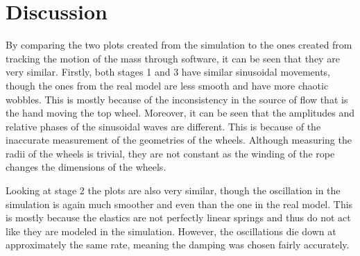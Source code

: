\documentclass[twoside,twocolumn]{article}
\begin{document}
\section{Discussion}

By comparing the two plots created from the simulation to the ones created from tracking the motion of the mass through software, it can be seen that they are very similar. Firstly, both stages 1 and 3 have similar sinusoidal movements, though the ones from the real model are less smooth and have more chaotic wobbles. This is mostly because of the inconsistency in the source of flow that is the hand moving the top wheel. Moreover, it can be seen that the amplitudes and relative phases of the sinusoidal waves are different. This is because of the inaccurate measurement of the geometries of the wheels. Although measuring the radii of the wheels is trivial, they are not constant as the winding of the rope changes the dimensions of the wheels.

Looking at stage 2 the plots are also very similar, though the oscillation in the simulation is again much smoother and even than the one in the real model. This is mostly because the elastics are not perfectly linear springs and thus do not act like they are modeled in the simulation. However, the oscillations die down at approximately the same rate, meaning the damping was chosen fairly accurately.
\end{document}
